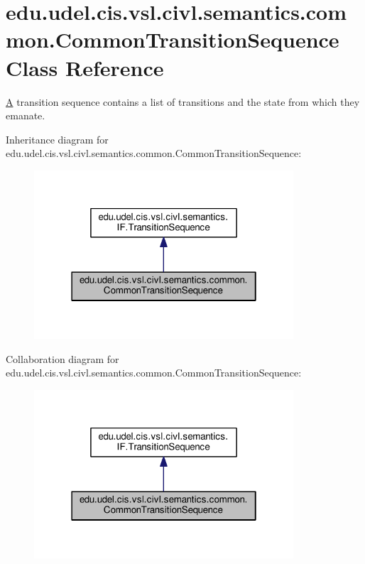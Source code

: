 \hypertarget{classedu_1_1udel_1_1cis_1_1vsl_1_1civl_1_1semantics_1_1common_1_1CommonTransitionSequence}{}\section{edu.\+udel.\+cis.\+vsl.\+civl.\+semantics.\+common.\+Common\+Transition\+Sequence Class Reference}
\label{classedu_1_1udel_1_1cis_1_1vsl_1_1civl_1_1semantics_1_1common_1_1CommonTransitionSequence}


\hyperlink{structA}{A} transition sequence contains a list of transitions and the state from which they emanate.  




Inheritance diagram for edu.\+udel.\+cis.\+vsl.\+civl.\+semantics.\+common.\+Common\+Transition\+Sequence\+:
\nopagebreak
\begin{figure}[H]
\begin{center}
\leavevmode
\includegraphics[width=274pt]{classedu_1_1udel_1_1cis_1_1vsl_1_1civl_1_1semantics_1_1common_1_1CommonTransitionSequence__inherit__graph}
\end{center}
\end{figure}


Collaboration diagram for edu.\+udel.\+cis.\+vsl.\+civl.\+semantics.\+common.\+Common\+Transition\+Sequence\+:
\nopagebreak
\begin{figure}[H]
\begin{center}
\leavevmode
\includegraphics[width=274pt]{classedu_1_1udel_1_1cis_1_1vsl_1_1civl_1_1semantics_1_1common_1_1CommonTransitionSequence__coll__graph}
\end{center}
\end{figure}
